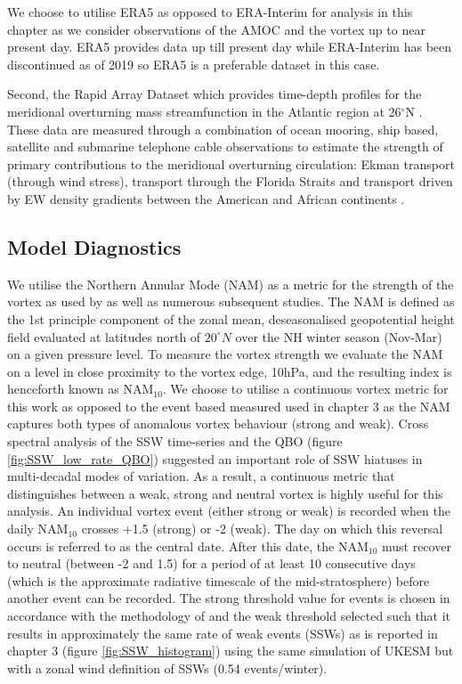 We choose to utilise ERA5 as opposed to ERA-Interim for analysis in this chapter as we consider observations of the AMOC and the vortex up to near present day. ERA5 provides data up till present day while ERA-Interim has been discontinued as of 2019 so ERA5 is a preferable dataset in this case. 

Second, the Rapid Array Dataset which provides time-depth profiles for the meridional overturning mass streamfunction in the Atlantic region at 26$^{\circ}$N \citep{moatAtlantic2020}. These data are measured through a combination of ocean mooring, ship based, satellite and submarine telephone cable observations to estimate the strength of primary contributions to the meridional overturning circulation: Ekman transport (through wind stress), transport through the Florida Straits and transport driven by EW density gradients between the American and African continents \citep{mccarthyMeasuring2015}.

\subsection{Model Diagnostics}
\label{sec:model_diagnostics_surface}
We utilise the Northern Annular Mode (NAM) as a metric for the strength of the vortex as used by \cite{baldwinStratospheric2001a} as well as numerous subsequent studies. The NAM is defined as the 1st principle component of the zonal mean, deseasonalised geopotential height field evaluated at latitudes north of $20^{\circ}N$ over the NH winter season (Nov-Mar) on a given pressure level. To measure the vortex strength we evaluate the NAM on a level in close proximity to the vortex edge, 10hPa, and the resulting index is henceforth known as NAM$_{10}$. We choose to utilise a continuous vortex metric for this work as opposed to the event based measured used in chapter 3 as the NAM captures both types of anomalous vortex behaviour (strong and weak). Cross spectral analysis of the SSW time-series and the QBO (figure \ref{fig:SSW_low_rate_QBO}) suggested an important role of SSW hiatuses in multi-decadal modes of variation. As a result, a continuous metric that distinguishes between a weak, strong and neutral vortex is highly useful for this analysis. An individual vortex event (either strong or weak) is recorded when the daily NAM$_{10}$ crosses +1.5 (strong) or -2 (weak). The day on which this reversal occurs is referred to as the central date. After this date, the NAM$_10$ must recover to neutral (between -2 and 1.5) for a period of at least 10 consecutive days (which is the approximate radiative timescale of the mid-stratosphere) before another event can be recorded. The strong threshold value for events is chosen in accordance with the methodology of \cite{baldwinStratospheric2001a} and the weak threshold selected such that it results in approximately the same rate of weak events (SSWs) as is reported in chapter 3 (figure \ref{fig:SSW_histogram}) using the same simulation of UKESM but with a zonal wind definition of SSWs (0.54 events/winter).

